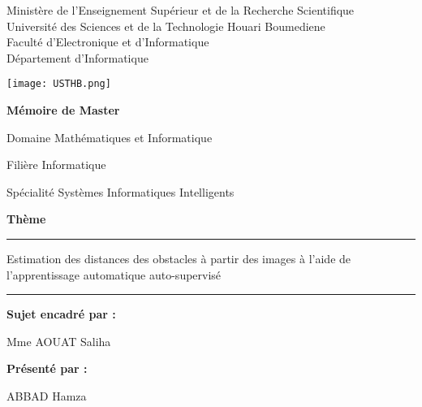 \begin{titlepage}
\begin{center}
\sffamily
{\small
Ministère de l'Enseignement Supérieur et de la Recherche Scientifique\\
Université des Sciences et de la Technologie Houari Boumediene\\
Faculté d'Electronique et d'Informatique\\
Département d'Informatique\\
}

\vspace{0.75em}

\texttt{[image: USTHB.png]}

\vspace{0.75em}

{\bfseries\LARGE Mémoire de Master}

\vspace{0.75em}

{\large Domaine}
{\large Mathématiques et Informatique}

\vspace{0.75em}

{\large Filière}
{\large Informatique}

\vspace{0.75em}

{\large Spécialité}
{\large Systèmes Informatiques Intelligents}

\vspace{1.5em}

{\bfseries\LARGE Thème}

\rule{\textwidth}{1pt}

{\fontsize{0.8cm}{0.8cm}\selectfont Estimation des distances des obstacles à partir des images à l'aide de l'apprentissage automatique auto-supervisé}

\rule{\textwidth}{1pt}

\vspace{3em}

\begin{minipage}[t]{0.3\textwidth}
\textbf{Sujet encadré par :}

Mme AOUAT Saliha
\end{minipage}
\hspace{\fill}
\begin{minipage}[t]{0.3\textwidth}
\textbf{Présenté par :}

ABBAD Hamza
\end{minipage}


\end{center}
\end{titlepage}
